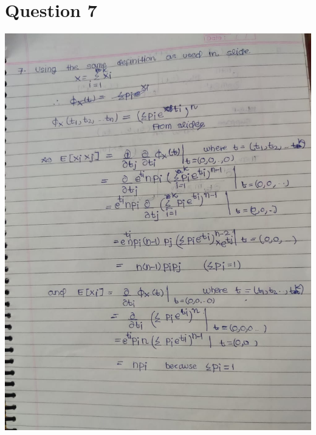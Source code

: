 \documentclass{article}
\theoremstyle{remark}
\begin{document}
\newpage



\section{Question 7}
\includegraphics[width=\textwidth, height=\textheight, keepaspectratio]{7a.jpeg}\par
\end{document}
